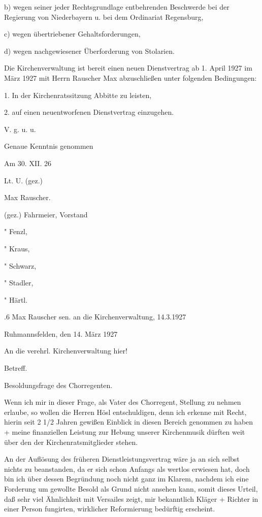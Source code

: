 \documentclass[12pt,a4paper]{book}
\begin{document}
b) wegen seiner jeder Rechtsgrundlage entbehrenden Beschwerde bei der Regierung
von Niederbayern u. bei dem Ordinariat Regensburg,

c) wegen übertriebener Gehaltsforderungen,

d) wegen nachgewiesener Überforderung von Stolarien.

Die Kirchenverwaltung ist bereit einen neuen Dienstvertrag ab 1. April 1927 im
März 1927 mit Herrn Rauscher Max abzuschließen unter folgenden Bedingungen:

1. In der Kirchenratssitzung Abbitte zu leisten,

2. auf einen neuentworfenen Dienstvertrag einzugehen.

V. g. u. u.



Genaue Kenntnis genommen

Am 30. XII. 26

Lt. U. (gez.)

Max Rauscher.



(gez.) Fahrmeier, Vorstand

   "     Fenzl,

   "     Kraus,

   "     Schwarz,

   "     Stadler,

   "     Härtl.

.6 Max Rauscher sen. an die Kirchenverwaltung, 14.3.1927

Ruhmannsfelden, den 14. März 1927



An die verehrl. Kirchenverwaltung hier!



Betreff.

Besoldungsfrage des Chorregenten.



Wenn ich mir in dieser Frage, als Vater des Chorregent, Stellung zu nehmen
erlaube, so wollen die Herren Hösl entschuldigen, denn ich erkenne mit Recht,
hierin seit 2 1/2 Jahren gewißen Einblick in diesen Bereich genommen zu haben +
meine finanziellen Leistung zur Hebung unserer Kirchenmusik dürften weit über
den der Kirchenratsmitglieder stehen.

An der Auflösung des früheren Dienstleistungsvertrag wäre ja an sich selbst
nichts zu beanstanden, da er sich schon Anfangs als wertlos erwiesen hat, doch
bin ich über dessen Begründung noch nicht ganz im Klarem, nachdem ich eine
Forderung um gewollte Besold als Grund nicht ansehen kann, somit dieses Urteil,
daß sehr viel Ähnlichkeit mit Versailes zeigt, mir bekanntlich Kläger + Richter
in einer Person fungirten, wirklicher Reformierung bedürftig erscheint.
\end{document}
